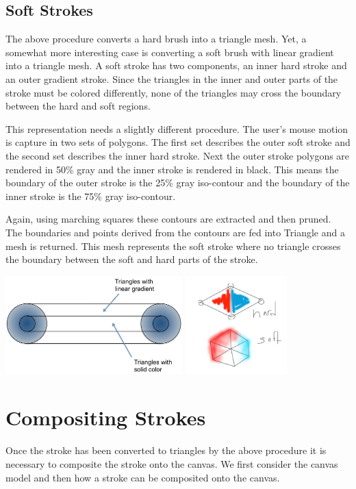 \documentclass[conference]{acmsiggraph}
\begin{document}
\subsection{Soft Strokes}
The above procedure converts a hard brush into a triangle mesh. Yet, a somewhat more interesting
case is converting a soft brush with linear gradient into a triangle mesh. A soft stroke has two
components, an inner hard stroke and an outer gradient stroke. Since the triangles in the inner and
outer parts of the stroke must be colored differently, none of the triangles may cross the boundary
between the hard and soft regions.

This representation needs a slightly different procedure. The user's mouse motion
is capture in two sets of polygons. The first set describes the outer soft stroke and the second set describes
the inner hard stroke. Next the outer stroke polygons are rendered in 50\% gray and the inner stroke
is rendered in black. This means the boundary of the outer stroke is the 25\% gray iso-contour and the
boundary of the inner stroke is the 75\% gray iso-contour.

Again, using marching squares these contours are extracted and then pruned. The boundaries and points
derived from the contours are fed into Triangle and a mesh is returned. This mesh represents the soft
stroke where no triangle crosses the boundary between the soft and hard parts
of the stroke.

\includegraphics[height=1.5in]{images/softstroke}
\includegraphics[height=1.5in]{images/hardvssoft}

\section{Compositing Strokes}
Once the stroke has been converted to triangles by the above procedure it is necessary to
composite the stroke onto the canvas. We first consider the canvas model and then how a
stroke can be composited onto the canvas.
\end{document}
